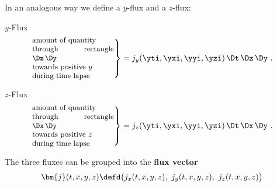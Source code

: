 In an analogous way we define a $y$-flux and a $z$-flux:

\begin{definition}{$y$-Flux}
  \begin{equation}
    \label{neq:yflux_expl}
    \left.\parbox[c]{10em}{\small amount of quantity\\ through rectangle $\Dz\,\Dy$\\ towards positive $y$\\during time lapse }\right\} =
    j_{y}(\yti,\yxi,\yyi,\yzi)\, \Dt\, \Dz\, \Dy \ .
  \end{equation}
\end{definition}
\begin{definition}{$z$-Flux}
  \begin{equation}
    \label{neq:zflux_expl}
    \left.\parbox[c]{10em}{\small amount of quantity\\ through rectangle $\Dx\,\Dy$\\ towards positive $z$\\during time lapse }\right\} =
    j_{z}(\yti,\yxi,\yyi,\yzi)\, \Dt\, \Dx\, \Dy \ .
  \end{equation}
\end{definition}

The three fluxes can be grouped into the \textbf{flux vector}
\begin{equation}
  \label{neq:flux_vector}
  \bm{j}(t,x,y,z) \defd
  \bigl(j_{x}(t,x,y,z),\ j_{y}(t,x,y,z),\ j_{z}(t,x,y,z)\bigr)
\end{equation}

